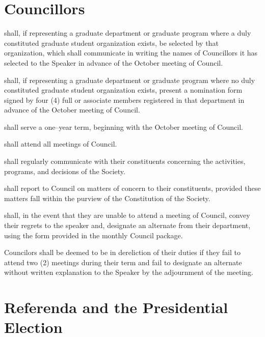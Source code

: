 \newpage


\section{Councillors}
\begin{longenum}[ label*=\thesection.\arabic*., align=left]
	\item shall, if representing a graduate department or graduate program where a duly constituted graduate student organization exists, be selected by that organization, which shall communicate in writing the names of Councillors it has selected to the Speaker in advance of the October meeting of Council. 
    \item shall, if representing a graduate department or graduate program where no duly constituted graduate student organization  exists, present a nomination form signed by four (4) full or associate members registered in that department in advance of the October meeting of Council. 
    \item shall serve a one--year term, beginning with the October meeting of Council. 
    \item shall attend all meetings of Council.
    \item shall regularly communicate with their constituents concerning the activities, programs, and decisions of the Society. 
    \item shall report to Council on matters of concern to their constituents, provided these matters fall within the purview of the Constitution of the Society. 
    \item shall, in the event that they are unable to attend a meeting of Council, convey their regrets to the speaker and, designate an alternate from their department, using the form provided in the monthly Council package.
    \item Councilors shall be deemed to be in dereliction of their duties if they fail to attend two (2) meetings during their term and fail to designate an alternate without written explanation to the Speaker by the adjournment  of the meeting. 
\end{longenum}
\newpage
\section{Referenda and the Presidential Election}
 


